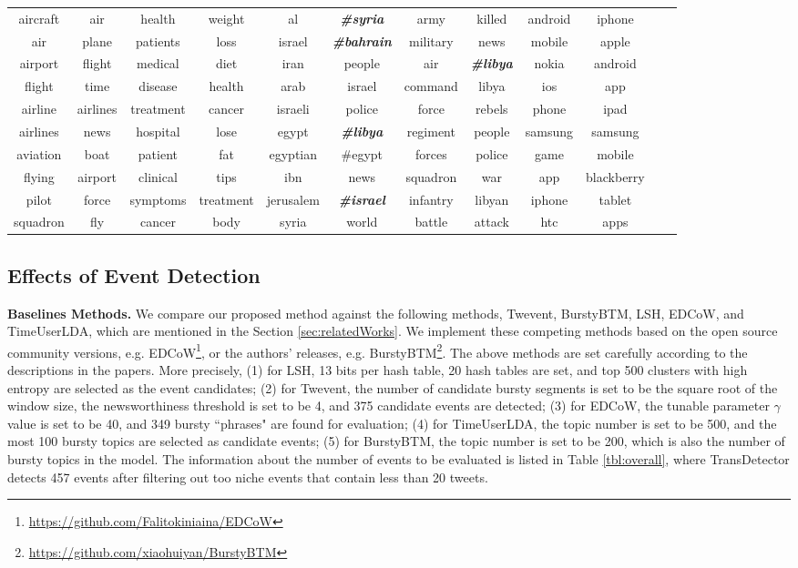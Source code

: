 \documentclass[runningheads,a4paper]{llncs}
\theoremstyle{exampstyle}
\begin{document}
\begin{table}[ht]
{\begin{tabular}{|cc|cc|cc|cc|cc|cc|}
\hline
aircraft & air & health & weight & al & \textbf{\textit{\#syria}} & army & killed & android & iphone\\ 
air & plane & patients & loss & israel & \textbf{\textit{\#bahrain}} & military & news & mobile & apple \\ 
airport & flight & medical & diet & iran & people & air & \textbf{\textit{\#libya}} & nokia & android \\ 
flight & time & disease & health & arab & israel & command & libya & ios & app \\
airline & airlines & treatment & cancer & israeli & police & force & rebels & phone & ipad \\
airlines & news & hospital & lose & egypt & \textbf{\textit{\#libya}} & regiment & people & samsung & samsung \\
aviation & boat & patient & fat & egyptian & \#egypt & forces & police & game & mobile\\
flying & airport & clinical & tips & ibn & news & squadron & war & app & blackberry \\
pilot & force & symptoms & treatment & jerusalem & \textbf{\textit{\#israel}} & infantry & libyan & iphone & tablet \\
squadron & fly & cancer & body & syria & world & battle & attack & htc & apps\\
\hline
\end{tabular}
}
\label{tbl:historyStates}
\end{table}

\subsection{Effects of Event Detection}
\textbf{Baselines Methods.} We compare our proposed method against the following methods, Twevent\cite{Twevent2012}, BurstyBTM\cite{Yan:2015wm}, LSH\cite{Petrovic:2010uj}, EDCoW\cite{Weng:2011wz}, and TimeUserLDA\cite{Diao:2012wj}, which are mentioned in the Section \ref{sec:relatedWorks}.
We implement these competing methods based on the open source community versions, e.g. EDCoW\footnote{\url{https://github.com/Falitokiniaina/EDCoW}}, or the authors' releases, e.g. BurstyBTM\footnote{\url{https://github.com/xiaohuiyan/BurstyBTM}}.
The above methods are set carefully according to the descriptions in the papers.
More precisely, (1) for LSH, 13 bits per hash table, 20 hash tables are set, and top 500 clusters with high entropy are selected as the event candidates; (2) for Twevent, the number of candidate bursty segments is set to be the square root of the window size, the newsworthiness threshold is set to be 4, and 375 candidate events are detected; (3) for EDCoW, the tunable parameter \(\gamma\) value is set to be 40, and 349 bursty ``phrases" are found for evaluation; (4) for TimeUserLDA, the topic number is set to be 500, and the most 100 bursty topics are selected as candidate events; (5) for BurstyBTM, the topic number is set to be 200, which is also the number of bursty topics in the model.
The information about the number of events to be evaluated is listed in Table \ref{tbl:overall}, where TransDetector detects 457 events after filtering out too niche events that contain less than 20 tweets. 
\end{document}
